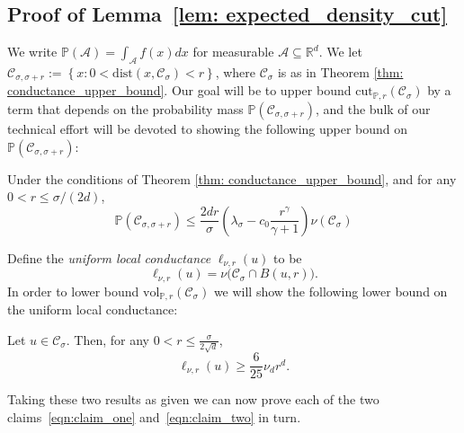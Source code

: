 \documentclass[11pt,twoside]{article}
\newcommand{\set}[1]{\left\{#1\right\}}
\newcommand{\vol}{\mathrm{vol}}
\newcommand{\cut}{\mathrm{cut}}
\newcommand{\Reals}{\mathbb{R}}
\newcommand{\Rd}{\Reals^d}
\newcommand{\1}{\mathbbm{1}}
\newcommand{\dist}{\mathrm{dist}}
\newcommand{\Xbf}{X}
\newcommand{\Pbb}{\mathbb{P}}
\newcommand{\Cset}{\mathcal{C}}
\newcommand{\Aset}{\mathcal{A}}
\newcommand{\Csig}{\Cset_{\sigma}}
\newcommand{\Csigr}{\Cset_{\sigma,\sigma + r}}
\begin{document}
\subsection{Proof of Lemma~\ref{lem: expected_density_cut}}
We write $\Pbb(\Aset) = \int_{\Aset} f(x) dx$ for measurable $\Aset \subseteq \Rd$.
We 
let $\Csigr := \set{x: 0 < \dist(x, \Csig) < r}$, where $\Csig$ is as in Theorem \ref{thm: conductance_upper_bound}. 
Our goal will be to upper bound $\cut_{\Pbb,r}(\Csig)$ by a term that depends on the probability mass $\Pbb(\Csigr)$, 
and the bulk of our technical effort will be devoted to showing the following upper bound on $\Pbb(\Csigr)$:
\begin{lemma}
	\label{lem: expected_number_boundary_points}
	Under the conditions of Theorem \ref{thm: conductance_upper_bound}, and for any $0 < r \leq \sigma/(2d)$,
	\begin{equation*}
	\Pbb(\Csigr) \leq \frac{2dr}{\sigma} \left(\lambda_{\sigma} - c_0\frac{r^{\gamma}}{\gamma + 1}\right) \nu(\Csig)
	\end{equation*}	
\end{lemma}
\noindent Define the \emph{uniform local conductance} $\ell_{\nu,r}(u)$ to be
\begin{equation*}
\ell_{\nu,r}(u) = \nu\bigl(\Csig \cap B(u,r)\bigr).
\end{equation*}
In order to lower bound $\vol_{\Pbb,r}(\Csig)$ we will show the following lower bound on the uniform local conductance:
\begin{lemma}
	\label{lem: local_conductance}
	Let $u \in \Csig$. Then, for any $0 < r \leq \frac{\sigma}{2\sqrt{d}}$,
	\begin{equation*}
	\ell_{\nu,r}(u) \geq \frac{6}{25} \nu_d r^d.
	\end{equation*}
\end{lemma}
Taking these two results as given we can now prove each of the two claims~\eqref{eqn:claim_one} and~\eqref{eqn:claim_two} in turn.
\end{document}
